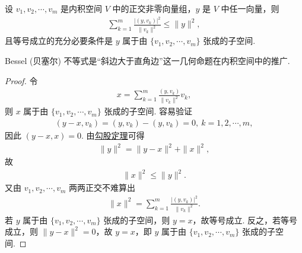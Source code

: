 \documentclass[../../main.tex]{subfiles}%
\begin{document}
\begin{theorem}\label{theorem:Bessel不等式}
设 $v_1, v_2, \cdots, v_m$ 是内积空间 $V$ 中的正交非零向量组，$y$ 是 $V$ 中任一向量，则
\begin{align*}
\sum_{k = 1}^{m}\frac{|(y, v_k)|^2}{\|v_k\|^2} \leqslant  \|y\|^2,
\end{align*}
且等号成立的充分必要条件是 $y$ 属于由 $\{v_1, v_2, \cdots, v_m\}$ 张成的子空间.
\end{theorem}
\begin{remark}
Bessel (贝塞尔) 不等式是“斜边大于直角边”这一几何命题在内积空间中的推广.
\end{remark}
\begin{proof}
令
\begin{align*}
x = \sum_{k = 1}^{m}\frac{(y, v_k)}{\|v_k\|^2}v_k,
\end{align*}
则 $x$ 属于由 $\{v_1, v_2, \cdots, v_m\}$ 张成的子空间. 容易验证
\begin{align*}
(y - x, v_k) =(y,v_k)-(y,v_k)= 0, \ k = 1, 2, \cdots, m,
\end{align*}
因此 $(y - x, x) = 0$. 由\hyperref[corollary:范数性质的相关推广-勾股定理]{勾股定理}可得
\begin{align*}
\|y\|^2 = \|y - x\|^2 + \|x\|^2,
\end{align*}
故
\begin{align*}
\|x\|^2 \leqslant  \|y\|^2.
\end{align*}
又由 $v_1, v_2, \cdots, v_m$ 两两正交不难算出
\begin{align*}
\|x\|^2 = \sum_{k = 1}^{m}\frac{|(y, v_k)|^2}{\|v_k\|^2}.
\end{align*}
若 $y$ 属于由 $\{v_1, v_2, \cdots, v_m\}$ 张成的子空间，则 $y = x$，故等号成立. 反之，若等号成立，则 $\|y - x\|^2 = 0$，故 $y = x$，即 $y$ 属于由 $\{v_1, v_2, \cdots, v_m\}$ 张成的子空间. 
\end{proof}
\end{document}

